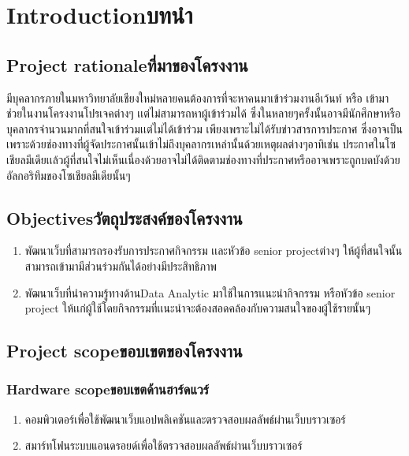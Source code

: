 \chapter{\ifenglish Introduction\else บทนำ\fi}

\section{\ifenglish Project rationale\else ที่มาของโครงงาน\fi}
มีบุคลากรภายในมหาวิทยาลัยเชียงใหม่หลายคนต้องการที่จะหาคนมาเข้าร่วมงานอีเว้นท์ หรือ เข้ามาช่วยในงานโครงงานโปรเจคต่างๆ เเต่ไม่สามารถหาผู้เข้าร่วมได้ ซึ่งในหลายๆครั้งนั้นอาจมีนักศึกษาหรือบุคลากรจำนวนมากที่สนใจเข้าร่วมเเต่ไม่ได้เข้าร่วม เพียงเพราะไม่ได้รับข่าวสารการประกาศ ซึ่งอาจเป็นเพราะด้วยช่องทางที่ผู้จัดประกาศนั้นเข้าไม่ถึงบุคลากรเหล่านั้นด้วยเหตุผลต่างๆอาทิเช่น ประกาศในโซเชียลมีเดียเเล้วผู้ที่สนใจไม่เห็นเนื่องด้วยอาจไม่ได้ติดตามช่องทางที่ประกาศหรืออาจเพราะถูกบดบังด้วยอัลกอริทึมของโซเชียลมีเดียนั้นๆ


\section{\ifenglish Objectives\else วัตถุประสงค์ของโครงงาน\fi}
\begin{enumerate}
    \item พัฒนาเว็บที่สามารถรองรับการประกาศกิจกรรม เเละหัวข้อ senior projectต่างๆ ให้ผู้ที่สนใจนั้นสามารถเข้ามามีส่วนร่วมกันได้อย่างมีประสิทธิภาพ
    \item พัฒนาเว็บที่นำความรู้ทางด้านData Analytic มาใช้ในการเเนะนำกิจกรรม หรือหัวข้อ senior project ให้เเก่ผู้ใช้โดยกิจกรรมที่เเนะนำจะต้องสอดคล้องกับความสนใจของผู้ใช้รายนั้นๆ
\end{enumerate}

\section{\ifenglish Project scope\else ขอบเขตของโครงงาน\fi}

\subsection{\ifenglish Hardware scope\else ขอบเขตด้านฮาร์ดแวร์\fi}
\begin{enumerate}
    \item คอมพิวเตอร์เพื่อใช้พัฒนาเว็บแอปพลิเคชันและตรวจสอบผลลัพธ์ผ่านเว็บบราวเซอร์
    \item สมาร์ทโฟนระบบแอนดรอยด์เพื่อใช้ตรวจสอบผลลัพธ์ผ่านเว็บบราวเซอร์
\end{enumerate}
